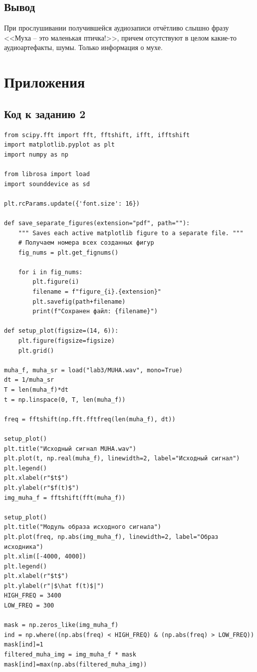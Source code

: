 \documentclass[a4paper, 12pt]{article}
\begin{document}
\subsection{Вывод}
При прослушивании получившейся аудиозаписи отчётливо слышно фразу <<Муха -- это маленькая птичка!>>, причем отсутствуют в целом какие-то аудиоартефакты, шумы. Только информация о мухе.

\section{Приложения}

\subsection{Код к заданию 2}
\begin{verbatim}
from scipy.fft import fft, fftshift, ifft, ifftshift
import matplotlib.pyplot as plt
import numpy as np

from librosa import load
import sounddevice as sd

plt.rcParams.update({'font.size': 16})

def save_separate_figures(extension="pdf", path=""):
    """ Saves each active matplotlib figure to a separate file. """
    # Получаем номера всех созданных фигур
    fig_nums = plt.get_fignums()

    for i in fig_nums:
        plt.figure(i)
        filename = f"figure_{i}.{extension}"
        plt.savefig(path+filename)
        print(f"Сохранен файл: {filename}")

def setup_plot(figsize=(14, 6)):
    plt.figure(figsize=figsize)
    plt.grid()

muha_f, muha_sr = load("lab3/MUHA.wav", mono=True)
dt = 1/muha_sr
T = len(muha_f)*dt
t = np.linspace(0, T, len(muha_f))

freq = fftshift(np.fft.fftfreq(len(muha_f), dt))

setup_plot()
plt.title("Исходный сигнал MUHA.wav")
plt.plot(t, np.real(muha_f), linewidth=2, label="Исходный сигнал")
plt.legend()
plt.xlabel(r"$t$")
plt.ylabel(r"$f(t)$")
img_muha_f = fftshift(fft(muha_f))

setup_plot()
plt.title("Модуль образа исходного сигнала")
plt.plot(freq, np.abs(img_muha_f), linewidth=2, label="Образ исходника")
plt.xlim([-4000, 4000])
plt.legend()
plt.xlabel(r"$t$")
plt.ylabel(r"|$\hat f(t)$|")
HIGH_FREQ = 3400
LOW_FREQ = 300

mask = np.zeros_like(img_muha_f)
ind = np.where((np.abs(freq) < HIGH_FREQ) & (np.abs(freq) > LOW_FREQ))
mask[ind]=1
filtered_muha_img = img_muha_f * mask
mask[ind]=max(np.abs(filtered_muha_img))


\end{verbatim}
\end{document}
